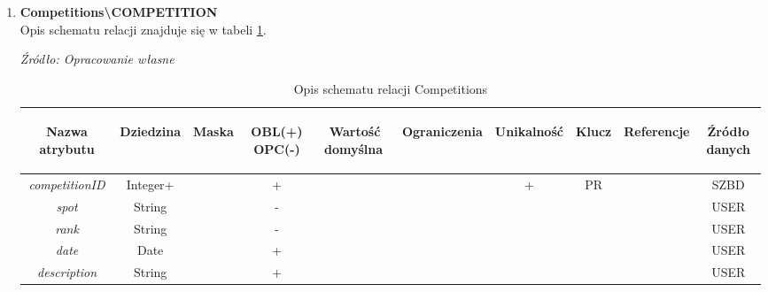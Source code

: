 \documentclass[12pt,oneside]{report}
\begin{document}
\begin{enumerate}[start=1,label={\bfseries REL\textbackslash0\arabic*}]
	\item \textbf{Competitions\textbackslash COMPETITION} \\
Opis schematu relacji znajduje się w tabeli \ref{CompetitionsRelationSchema}.
\begin{table}[h!]
	\caption{Opis schematu relacji Competitions}
	\textit{Źródło: Opracowanie własne}
	\label{CompetitionsRelationSchema}
	\centering
	\begin{tabular}{|c|c|c|c|c|c|c|c|c|c|}
		\hline
		\begin{sideways}Nazwa atrybutu\end{sideways}& 
		\begin{sideways}Dziedzina \end{sideways}& 
		\begin{sideways}Maska \end{sideways}& 
		\begin{sideways}OBL(+) OPC(-)\end{sideways} & 
		\begin{sideways}Wartość domyślna$\ $\end{sideways}& 
		\begin{sideways}Ograniczenia\end{sideways} &
		\begin{sideways}Unikalność \end{sideways}& 
		\begin{sideways}Klucz \end{sideways}& 
		\begin{sideways}Referencje \end{sideways}&
		\begin{sideways}Źródło danych\end{sideways}\\
		\hline
		\textit{competitionID} & Integer+ & & + & & & + & PR & &SZBD\\
		\hline
		\textit{spot} & String & & - & & & & & &USER\\
		\hline
		\textit{rank} & String & & - & & & & & &USER\\
		\hline
		\textit{date} & Date & & + & & & & & &USER\\
		\hline
		\textit{description}  & String & & + & & & & & &USER\\
		\hline		
	\end{tabular}
\end{table}


\end{enumerate}
\end{document}
